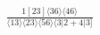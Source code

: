 \documentclass[varwidth, border=5pt]{standalone}
\begin{document}
\begin{my}
$\begin{gathered}
\scriptscriptstyle\frac{1[23]⟨36⟩⟨46⟩}{⟨13⟩⟨23⟩⟨56⟩⟨3|2+4|3]}
\end{gathered}$
\end{my}
\end{document}

